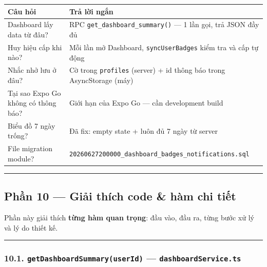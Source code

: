 \documentclass[12pt,a4paper]{article}
\newcounter{none}
\begin{document}
{\def\LTcaptype{none} %
\begin{longtable}[]{@{}
  >{\raggedright\arraybackslash}p{}
  >{\raggedright\arraybackslash}p{}@{}}
\toprule\noalign{}
\begin{minipage}[b]{\linewidth}\raggedright
Câu hỏi
\end{minipage} & \begin{minipage}[b]{\linewidth}\raggedright
Trả lời ngắn
\end{minipage} \\
\midrule\noalign{}
\endhead
\bottomrule\noalign{}
\endlastfoot
Dashboard lấy data từ đâu? & RPC \texttt{get\_dashboard\_summary()} ---
1 lần gọi, trả JSON đầy đủ \\
Huy hiệu cấp khi nào? & Mỗi lần mở Dashboard, \texttt{syncUserBadges}
kiểm tra và cấp tự động \\
Nhắc nhở lưu ở đâu? & Cờ trong \texttt{profiles} (server) + id thông báo
trong AsyncStorage (máy) \\
Tại sao Expo Go không có thông báo? & Giới hạn của Expo Go --- cần
development build \\
Biểu đồ 7 ngày trống? & Đã fix: empty state + luôn đủ 7 ngày từ
server \\
File migration module? &
\texttt{20260627200000\_dashboard\_badges\_notifications.sql} \\
\end{longtable}
}

\begin{center}\rule{0.5\linewidth}{0.5pt}\end{center}

\subsection{Phần 10 --- Giải thích code \& hàm chi
tiết}\label{phux1ea7n-10-giux1ea3i-thuxedch-code-huxe0m-chi-tiux1ebft}

Phần này giải thích \textbf{từng hàm quan trọng}: đầu vào, đầu ra, từng
bước xử lý và lý do thiết kế.

\begin{center}\rule{0.5\linewidth}{0.5pt}\end{center}

\subsubsection{\texorpdfstring{10.1.
\texttt{getDashboardSummary(userId)} ---
\texttt{dashboardService.ts}}{10.1. getDashboardSummary(userId) --- dashboardService.ts}}\label{getdashboardsummaryuserid-dashboardservice.ts}
\end{document}
